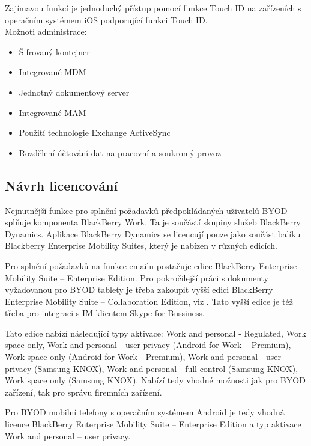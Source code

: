 Zajímavou funkcí je jednoduchý přístup pomocí funkce Touch ID na zařízeních s operačním systémem iOS podporující funkci Touch ID.\\

Možnoti administrace:
\begin{itemize}
   \item Šifrovaný kontejner
   \item Integrované MDM
   \item Jednotný dokumentový server
   \item Integrované MAM
   \item Použití technologie Exchange ActiveSync
   \item Rozdělení účtování dat na pracovní a soukromý provoz
\end{itemize}

\subsection{Návrh licencování}

Nejnutnější funkce pro splnění požadavků předpokládaných uživatelů BYOD splňuje komponenta BlackBerry Work. Ta je součástí skupiny služeb BlackBerry Dynamics. Aplikace BlackBerry Dynamics se licencují pouze jako součást balíku Blackberry Enterprise Mobility Suites, který je nabízen v různých edicích.

Pro splnění požadavků na funkce emailu postačuje edice BlackBerry Enterprise Mobility Suite --  Enterprise Edition. Pro pokročilejší práci s dokumenty vyžadovanou pro BYOD tablety je třeba zakoupit vyšší edici BlackBerry Enterprise Mobility Suite -- Collaboration Edition, viz . Tato vyšší edice je též třeba pro integraci s IM klientem Skype for Bussiness.

Tato edice nabízí následující typy aktivace: Work and personal - Regulated, Work space only, Work and personal - user privacy (Android for Work -- Premium), Work space only (Android for Work - Premium), Work and personal - user privacy (Samsung KNOX), Work and personal - full control (Samsung KNOX), Work space only (Samsung KNOX). Nabízí tedy vhodné možnosti jak pro BYOD zařízení, tak pro správu firemních zařízení. 

Pro BYOD mobilní telefony s operačním systémem Android je tedy vhodná licence BlackBerry Enterprise Mobility Suite -- Enterprise Edition a typ aktivace Work and personal -- user privacy.

